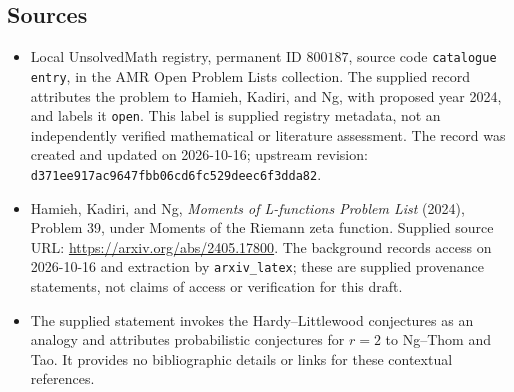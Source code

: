 \documentclass[11pt]{article}
\begin{document}
\subsection{Sources}
\begin{itemize}
\item Local UnsolvedMath registry, permanent ID \(800187\), source code \texttt{catalogue entry}, in the AMR Open Problem Lists collection. The supplied record attributes the problem to Hamieh, Kadiri, and Ng, with proposed year 2024, and labels it \texttt{open}. This label is supplied registry metadata, not an independently verified mathematical or literature assessment. The record was created and updated on 2026-10-16; upstream revision: \texttt{d371ee917ac9647fbb06cd6fc529deec6f3dda82}.
\item Hamieh, Kadiri, and Ng, \emph{Moments of L-functions Problem List} (2024), Problem 39, under Moments of the Riemann zeta function. Supplied source URL: \url{https://arxiv.org/abs/2405.17800}. The background records access on 2026-10-16 and extraction by \texttt{arxiv\_latex}; these are supplied provenance statements, not claims of access or verification for this draft.
\item The supplied statement invokes the Hardy--Littlewood conjectures as an analogy and attributes probabilistic conjectures for \(r=2\) to Ng--Thom and Tao. It provides no bibliographic details or links for these contextual references.
\end{itemize}
\end{document}
